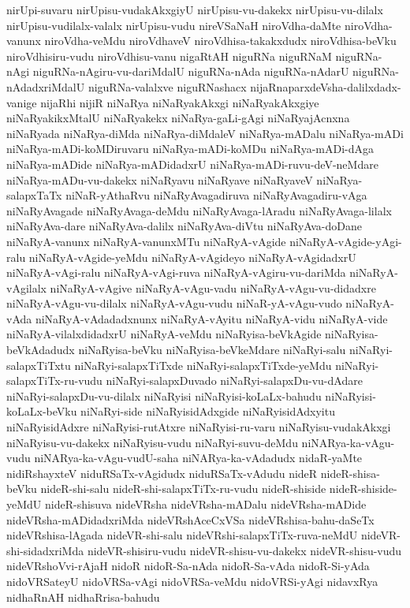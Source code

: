 {nirUpi-suvaru
nirUpisu-vudakAkxgiyU
nirUpisu-vu-dakekx
nirUpisu-vu-dilalx
nirUpisu-vudilalx-valalx
nirUpisu-vudu
nireVSaNaH
niroVdha-daMte
niroVdha-vanunx
niroVdha-veMdu
niroVdhaveV
niroVdhisa-takakxdudx
niroVdhisa-beVku
niroVdhisiru-vudu
niroVdhisu-vanu
nigaRtAH
niguRNa
niguRNaM
niguRNa-nAgi
niguRNa-nAgiru-vu-dariMdalU
niguRNa-nAda
niguRNa-nAdarU
niguRNa-nAdadxriMdalU
niguRNa-valalxve
niguRNashacx
nijaRnaparxdeVsha-dalilxdadx-vanige
nijaRhi
nijiR
niNaRya
niNaRyakAkxgi
niNaRyakAkxgiye
niNaRyakikxMtalU
niNaRyakekx
niNaRya-gaLi-gAgi
niNaRyajAcnxna
niNaRyada
niNaRya-diMda
niNaRya-diMdaleV
niNaRya-mADalu
niNaRya-mADi
niNaRya-mADi-koMDiruvaru
niNaRya-mADi-koMDu
niNaRya-mADi-dAga
niNaRya-mADide
niNaRya-mADidadxrU
niNaRya-mADi-ruvu-deV-neMdare
niNaRya-mADu-vu-dakekx
niNaRyavu
niNaRyave
niNaRyaveV
niNaRya-salapxTaTx
niNaR-yAthaRvu
niNaRyAvagadiruva
niNaRyAvagadiru-vAga
niNaRyAvagade
niNaRyAvaga-deMdu
niNaRyAvaga-lAradu
niNaRyAvaga-lilalx
niNaRyAva-dare
niNaRyAva-dalilx
niNaRyAva-diVtu
niNaRyAva-doDane
niNaRyA-vanunx
niNaRyA-vanunxMTu
niNaRyA-vAgide
niNaRyA-vAgide-yAgi-ralu
niNaRyA-vAgide-yeMdu
niNaRyA-vAgideyo
niNaRyA-vAgidadxrU
niNaRyA-vAgi-ralu
niNaRyA-vAgi-ruva
niNaRyA-vAgiru-vu-dariMda
niNaRyA-vAgilalx
niNaRyA-vAgive
niNaRyA-vAgu-vadu
niNaRyA-vAgu-vu-didadxre
niNaRyA-vAgu-vu-dilalx
niNaRyA-vAgu-vudu
niNaR-yA-vAgu-vudo
niNaRyA-vAda
niNaRyA-vAdadadxnunx
niNaRyA-vAyitu
niNaRyA-vidu
niNaRyA-vide
niNaRyA-vilalxdidadxrU
niNaRyA-veMdu
niNaRyisa-beVkAgide
niNaRyisa-beVkAdadudx
niNaRyisa-beVku
niNaRyisa-beVkeMdare
niNaRyi-salu
niNaRyi-salapxTiTxtu
niNaRyi-salapxTiTxde
niNaRyi-salapxTiTxde-yeMdu
niNaRyi-salapxTiTx-ru-vudu
niNaRyi-salapxDuvado
niNaRyi-salapxDu-vu-dAdare
niNaRyi-salapxDu-vu-dilalx
niNaRyisi
niNaRyisi-koLaLx-bahudu
niNaRyisi-koLaLx-beVku
niNaRyi-side
niNaRyisidAdxgide
niNaRyisidAdxyitu
niNaRyisidAdxre
niNaRyisi-rutAtxre
niNaRyisi-ru-varu
niNaRyisu-vudakAkxgi
niNaRyisu-vu-dakekx
niNaRyisu-vudu
niNaRyi-suvu-deMdu
niNARya-ka-vAgu-vudu
niNARya-ka-vAgu-vudU-saha
niNARya-ka-vAdadudx
nidaR-yaMte
nidiRshayxteV
niduRSaTx-vAgidudx
niduRSaTx-vAdudu
nideR
nideR-shisa-beVku
nideR-shi-salu
nideR-shi-salapxTiTx-ru-vudu
nideR-shiside
nideR-shiside-yeMdU
nideR-shisuva
nideVRsha
nideVRsha-mADalu
nideVRsha-mADide
nideVRsha-mADidadxriMda
nideVRshAceCxVSa
nideVRshisa-bahu-daSeTx
nideVRshisa-lAgada
nideVR-shi-salu
nideVRshi-salapxTiTx-ruva-neMdU
nideVR-shi-sidadxriMda
nideVR-shisiru-vudu
nideVR-shisu-vu-dakekx
nideVR-shisu-vudu
nideVRshoVvi-rAjaH
nidoR
nidoR-Sa-nAda
nidoR-Sa-vAda
nidoR-Si-yAda
nidoVRSateyU
nidoVRSa-vAgi
nidoVRSa-veMdu
nidoVRSi-yAgi
nidavxRya
nidhaRnAH
nidhaRrisa-bahudu
}
